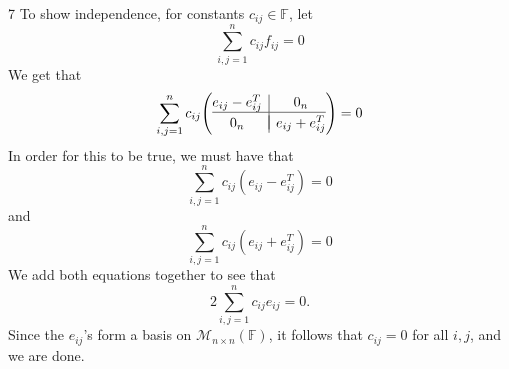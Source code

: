 \documentclass{article}
\makeatletter
\newenvironment{amatrix}[1]{%
  \left(\begin{array}{@{}*{#1}{c}|c@{}}
}{%
  \end{array}\right)
}
\theoremstyle{plain} %
\numberwithin{thm}{section} %
\theoremstyle{definition}
\makeatother
\begin{document}
\begin{question}{7}
        To show independence, for constants \(c_{ij} \in \mathbb{F}\), let
        \[
            \sum_{i,j=1}^{n} c_{ij} f_{ij} = 0
        \]
        We get that
        \begin{align*}
            \sum_{i,j=1}^{n} c_{ij}\begin{amatrix}{1}
                e_{ij} - e_{ij}^T & 0_n \\
                \hline \\[-10pt]
                0_n &  e_{ij} + e_{ij}^T \\
            \end{amatrix} = 0
        \end{align*}
        In order for this to be true, we must have that
        \[
            \sum_{i,j=1}^{n} c_{ij} (e_{ij} - e_{ij}^T) = 0
        \]
        and
        \[
            \sum_{i,j=1}^{n} c_{ij} (e_{ij} + e_{ij}^T) = 0
        \]
        We add both equations together to see that
        \[
            2 \sum_{i,j=1}^{n} c_{ij} e_{ij} = 0.
        \]
        Since the \(e_{ij}\)'s form a basis on \(\mathcal{M} _{n\times n}(\mathbb{F})\), it follows that \(c_{ij} = 0\) for all \(i,j\), and we are done.
    \end{question}
    \newpage
\end{document}
